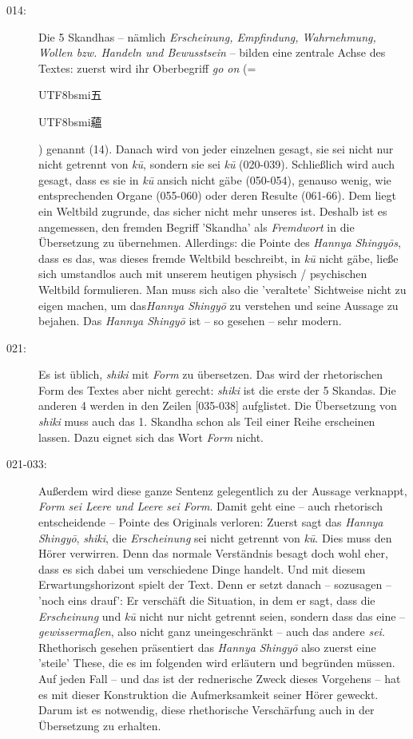\documentclass[
DIV=calc,
BCOR=5mm,
11pt,
headings=small,
oneside,
bibtotocnumbered,
english,ngerman]{scrartcl}
\newcommand{\cnbsmi}[1]{\begin{CJK}{UTF8}{bsmi}#1\end{CJK}}
\begin{document}
\begin{description}
  \item[014:] Die 5 Skandhas -- nämlich \emph{Erscheinung, Empfindung,
  Wahrnehmung, Wollen bzw. Handeln und Bewusstsein} -- bilden eine zentrale
  Achse des Textes: zuerst wird ihr Oberbegriff \emph{go on} (= \cnbsmi{五}
  \cnbsmi{蘊}) genannt (14). Danach wird von jeder einzelnen gesagt, sie sei
  nicht nur nicht getrennt von \emph{kū}, sondern sie sei \emph{kū} (020-039).
  Schließlich wird auch gesagt, dass es sie in \emph{kū} ansich nicht gäbe
  (050-054), genauso wenig, wie entsprechenden Organe (055-060) oder deren
  Resulte (061-66). Dem liegt ein Weltbild zugrunde, das sicher nicht mehr
  unseres ist. Deshalb ist es angemessen, den fremden Begriff 'Skandha' als
  \emph{Fremdwort} in die Übersetzung zu übernehmen. Allerdings: die Pointe des
  \emph{Hannya Shingyōs}, dass es das, was dieses fremde Weltbild beschreibt, in
  \emph{kū} nicht gäbe, ließe sich umstandlos auch mit unserem heutigen physisch
  / psychischen Weltbild formulieren. Man muss sich also die 'veraltete'
  Sichtweise nicht zu eigen machen, um das\emph{Hannya Shingyō} zu verstehen und
  seine Aussage zu bejahen. Das \emph{Hannya Shingyō} ist -- so gesehen -- sehr
  modern.
  
  \item[021:] Es ist üblich, \emph{shiki} mit \emph{Form} zu übersetzen. Das
  wird der rhetorischen Form des Textes aber nicht gerecht: \emph{shiki} ist die
  erste der 5 Skandas. Die anderen 4 werden in den Zeilen [035-038] aufglistet.
  Die Übersetzung von \emph{shiki} muss auch das 1. Skandha schon als Teil einer
  Reihe erscheinen lassen. Dazu eignet sich das Wort \emph{Form} nicht.

  \item[021-033:] Außerdem wird diese ganze Sentenz gelegentlich zu der Aussage
  verknappt, \emph{Form sei Leere und Leere sei Form}. Damit geht eine -- auch
  rhetorisch entscheidende -- Pointe des Originals verloren: Zuerst sagt das
  \emph{Hannya Shingyō}, \emph{shiki}, die \emph{Erscheinung} sei nicht getrennt
  von \emph{kū}. Dies muss den Hörer verwirren. Denn das normale Verständnis
  besagt doch wohl eher, dass es sich dabei um verschiedene Dinge handelt. Und
  mit diesem Erwartungshorizont spielt der Text. Denn er setzt danach --
  sozusagen -- 'noch eins drauf': Er verschäft die Situation, in dem er sagt,
  dass die \emph{Erscheinung} und \emph{kū} nicht nur nicht getrennt seien,
  sondern dass das eine -- \emph{gewissermaßen}, also nicht ganz uneingeschränkt
  -- auch das andere \emph{sei}. Rhethorisch gesehen präsentiert das
  \emph{Hannya Shingyō} also zuerst eine 'steile' These, die es im folgenden
  wird erläutern und begründen müssen. Auf jeden Fall -- und das ist der
  rednerische Zweck dieses Vorgehens -- hat es mit dieser Konstruktion die
  Aufmerksamkeit seiner Hörer geweckt. Darum ist es notwendig, diese
  rhethorische Verschärfung auch in der Übersetzung zu erhalten.
  

\end{description}
\end{document}
